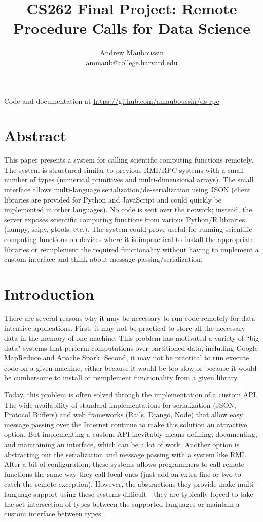 \documentclass[11pt]{article}
\title{CS262 Final Project: Remote Procedure Calls for Data Science}
\author{Andrew Mauboussin \\ ammaub@college.harvard.edu}
\begin{document}
\maketitle{}
Code and documentation at \href{https://github.com/amauboussin/ds-rpc}{https://github.com/amauboussin/ds-rpc}

\section{Abstract}
This paper presents a system for calling scientific computing functions remotely. The system is structured similar to previous RMI/RPC systems with a small number of types (numerical primitives and multi-dimensional arrays). The small interface allows multi-language serialization/de-serialization using JSON (client libraries are provided for Python and JavaScript and could quickly be implemented in other languages). No code is sent over the network; instead, the server exposes scientific computing functions from various Python/R libraries (numpy, scipy, gtools, etc.). The system could prove useful for running scientific computing functions on devices where it is impractical to install the appropriate libraries or reimplement the required functionality  without having to implement a custom interface and think about message passing/serialization. 

\section{Introduction}

There are several reasons why it may be necessary to run code remotely for data intensive applications. First, it may not be practical to store all the necessary data in the memory of one machine. This problem has motivated a variety of ``big data" systems that perform computations over partitioned data, including Google MapReduce and Apache Spark. Second, it may not be practical to run execute code on a given machine, either because it would be too slow or because it would be cumbersome to install or reimplement functionality from a given library. 

Today, this problem is often solved through the implementation of a custom API. The wide availability of standard implementations for serialization (JSON, Protocol Buffers) and web frameworks (Rails, Django, Node) that allow easy message passing over the Internet continue to make this solution an attractive option. But implementing a custom API inevitably means defining, documenting, and maintaining an interface, which can be a lot of work. Another option is abstracting out the serialization and message passing with a system like RMI. After a bit of configuration, these systems allows programmers to call remote functions the same way they call local ones (just add an extra line or two to catch the remote exception). However, the abstractions they provide make multi-language support using these systems difficult - they are typically forced to take the set intersection of types between the supported languages or maintain a custom interface between types. 
\end{document}
